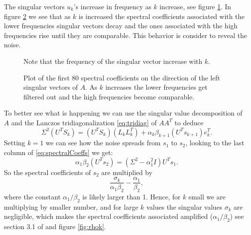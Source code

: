\documentclass[11pt]{amsart}
\begin{document}
The singular vectors $u_{k}$'s increase in frequency as $k$ increase, see figure
\ref{fig:singularVectors}. In figure \ref{fig:spectralCoeffs} we see that as $k$
is increased the spectral coefficients associated with the lower frequencies 
singular vectors decay and the ones associated with the high frequencies rise 
until they are comparable. This behavior is consider to reveal the noise.
\begin{figure}[htb] \label{fig:singularVectors}
  \begin{center}
  \end{center}
\caption{Note that the frequency of the singular vector increase with $k$.}
\end{figure}
\begin{figure}[htb] \label{fig:spectralCoeffs}
  \begin{center}
  \end{center}
\caption{Plot of the first 80 spectral coefficients on the direction of the left
singular vectors of $A$. As $k$ increases the lower frequencies get filtered out
and the high frequencies become comparable.}
\end{figure}

To better see what is happening we can use the singular value decomposition of
$A$ and the Lanczos tridiagonalization \eqref{eq:tridiag} of $AA^{T}$ to deduce
\begin{equation} \label{eq:spectralCoeffs}
  \Sigma^{2}(U^{T}S_{k}) = (U^{T}S_{k})(L_{k}L_{k}^{T}) + 
  \alpha_{k}\beta_{k+1}(U^{T}s_{k+1})e_{k}^{T}.
\end{equation}
Setting $k = 1$ we can see how the noise spreads from $s_{1}$ to $s_{2}$,
looking to the last column of \eqref{eq:spectralCoeffs} we get:
\begin{equation*}
  \alpha_{1}\beta_{2}(U^{T}s_{2}) = (\Sigma^{2} - \alpha_{1}^{2}I)U^{T}s_{1}.
\end{equation*}
So the spectral coefficients of $s_{2}$ are multiplied by
\begin{equation*}
  \frac{\sigma_{k}}{\alpha_{1}\beta_{2}} - \frac{\alpha_{1}}{\beta_{2}},
\end{equation*}
where the constant $\alpha_{1}/\beta_{2}$ is likely larger than 1. Hence, for 
$k$ small we are multiplying by smaller number, and for large $k$ values the
singular values $\sigma_{k}$ are negligible, which makes the spectral
coefficients associated amplified ($\alpha_{1}/\beta_{2}$) see section 3.1 of 
\cite{bidiagonalization} and figure \ref{fig:rhok}.
\end{document}
